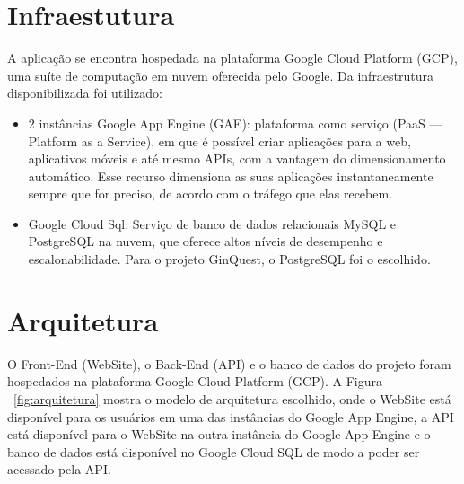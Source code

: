 \documentclass[
    12pt,               %
    openright,          %
    twoside,            %
    a4paper,            %
    openany             %
    draft,              %
    MODELO,             %
    TODO,               %
    english,            %
    brazil              %
    ]{ifsp-spo-inf-ctds}
\begin{document}
\vspace{1cm}
\section{Infraestutura}

A aplicação se encontra hospedada na plataforma Google Cloud Platform (GCP), uma suíte de computação em nuvem oferecida pelo Google. Da infraestrutura disponibilizada foi utilizado:


\begin{itemize}

\item 2 instâncias Google App Engine (GAE): plataforma como serviço (PaaS — Platform as a Service), em que é possível criar aplicações para a web, aplicativos móveis e até mesmo APIs, com a vantagem do dimensionamento automático. Esse recurso dimensiona as suas aplicações instantaneamente sempre que for preciso, de acordo com o tráfego que elas recebem. \cite{jackson2018}

\item Google Cloud Sql: Serviço de banco de dados relacionais MySQL e PostgreSQL na nuvem, que oferece altos níveis de desempenho e escalonabilidade. Para o projeto GinQuest, o PostgreSQL foi o escolhido.
\end{itemize}

\section{Arquitetura}

O Front-End (WebSite), o Back-End (API) e o banco de dados do projeto foram hospedados na plataforma Google Cloud Platform (GCP). A Figura  ~\ref{fig:arquitetura} mostra o modelo de arquitetura escolhido, onde o WebSite está disponível para os usuários em uma das instâncias do Google App Engine, a API está disponível para o WebSite na outra instância do Google App Engine e o banco de dados está disponível no Google Cloud SQL de modo a poder ser acessado pela API.
\end{document}

